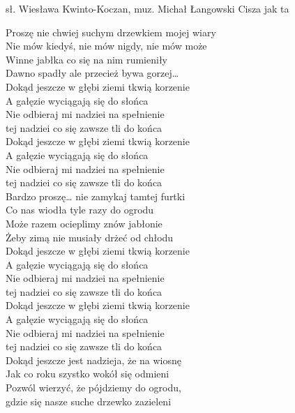 {sł. Wiesława Kwinto-Koczan, muz. Michał Łangowski}
{Cisza jak ta}
\begin{text}
	\hfill\break
	Proszę nie chwiej suchym drzewkiem mojej wiary\\
	Nie mów kiedyś, nie mów nigdy, nie mów może \\
	Winne jabłka co się na nim rumieniły\\
	Dawno spadły ale przecież bywa gorzej…\\

	Dokąd jeszcze w głębi ziemi tkwią korzenie\\
	A gałęzie wyciągają się do słońca\\
	Nie odbieraj mi nadziei na spełnienie\\
	tej nadziei co się zawsze tli do końca\\

	Dokąd jeszcze w głębi ziemi tkwią korzenie\\
	A gałęzie wyciągają się do słońca\\
	Nie odbieraj mi nadziei na spełnienie\\
	tej nadziei co się zawsze tli do końca\\

	Bardzo proszę… nie zamykaj tamtej furtki\\
	Co nas wiodła tyle razy do ogrodu\\
	Może razem ocieplimy znów jabłonie\\
	Żeby zimą nie musiały drżeć od chłodu\\

	Dokąd jeszcze w głębi ziemi tkwią korzenie\\
	A gałęzie wyciągają się do słońca\\
	Nie odbieraj mi nadziei na spełnienie\\
	tej nadziei co się zawsze tli do końca\\

	Dokąd jeszcze w głębi ziemi tkwią korzenie\\
	A gałęzie wyciągają się do słońca\\
	Nie odbieraj mi nadziei na spełnienie\\
	tej nadziei co się zawsze tli do końca\\

	Dokąd jeszcze jest nadzieja, że na wiosnę\\
	Jak co roku szystko wokół się odmieni\\
	Pozwól wierzyć, że pójdziemy do ogrodu,\\
	gdzie się nasze suche drzewko zazieleni\\
\end{text}
